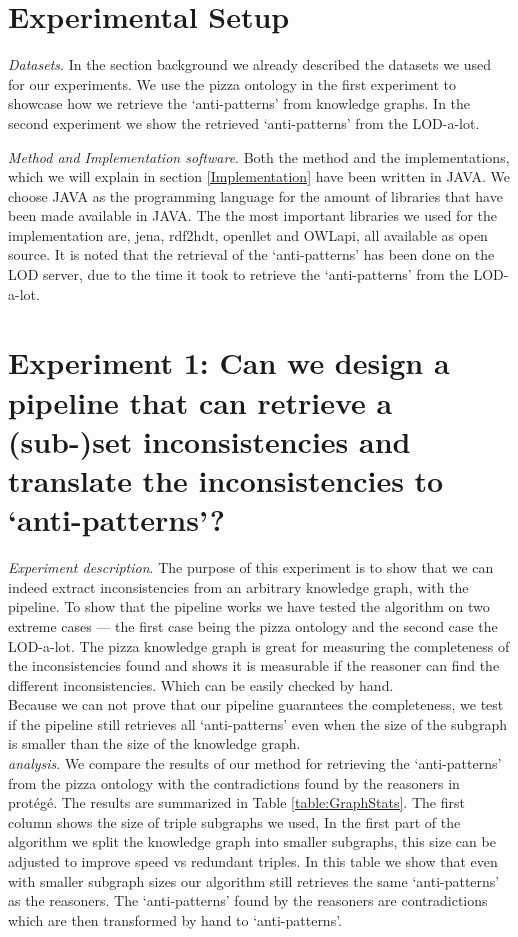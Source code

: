 \documentclass[11pt,letterpaper ,oneside ]{book}
\begin{document}
\section{Experimental Setup}
\textit{Datasets}. In the section background we already described the datasets we used for our experiments. We use the pizza ontology in the first experiment to showcase how we retrieve the `anti-patterns' from knowledge graphs. In the second experiment we show the retrieved `anti-patterns' from the LOD-a-lot.

\textit{Method and Implementation software}. Both the method and the implementations, which we will explain in section \ref{Implementation} have been written in JAVA. We choose JAVA as the programming language for the amount of libraries that have been made available in JAVA. The the most important libraries we used for the implementation are, jena, rdf2hdt, openllet and OWLapi, all available as open source. It is noted that the retrieval of the `anti-patterns' has been done on the LOD server, due to the time it took to retrieve the `anti-patterns' from the LOD-a-lot. 

\section{Experiment 1:  Can we design a pipeline that can retrieve a (sub-)set inconsistencies and translate the inconsistencies to `anti-patterns'?}
\textit{Experiment description}. The purpose of this experiment is to show that we can indeed extract inconsistencies from an arbitrary knowledge graph, with the pipeline. 
To show that the pipeline works we have tested the algorithm on two extreme cases — the first case being the pizza ontology and the second case the LOD-a-lot.
The pizza knowledge graph is great for measuring the completeness of the inconsistencies found and shows it is measurable if the reasoner can find the different inconsistencies. Which can be easily checked by hand.\\
Because we can not prove that our pipeline guarantees the completeness, we test if the pipeline still retrieves all `anti-patterns' even when the size of the subgraph is 
smaller than the size of the knowledge graph.\\
\textit{analysis}. We compare the results of our method for retrieving the `anti-patterns' from the pizza ontology with the contradictions found by the reasoners in prot\'{e}g\'{e}.
The results are summarized in Table \ref{table:GraphStats}. The first column shows the size of triple subgraphs we used, In the first part of the algorithm we split the knowledge graph into smaller subgraphs, this size can be adjusted to improve speed vs redundant triples. In this table we show that even with smaller subgraph sizes our algorithm still retrieves the same `anti-patterns' as the reasoners. The `anti-patterns' found by the reasoners are contradictions which are then transformed by hand to `anti-patterns'. 
\end{document}
